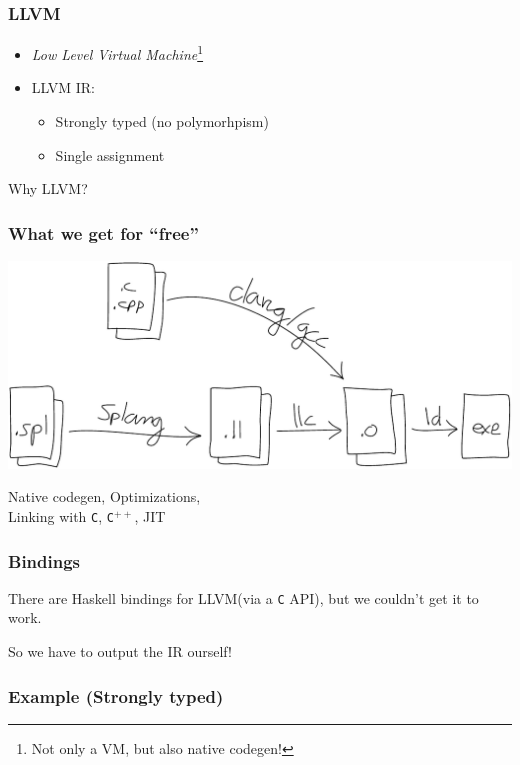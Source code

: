 \documentclass[14pt]{beamer}
\newcommand{\llvm}{\textsc{LLVM}\xspace}
\newcommand{\C}{\texttt{C}\xspace}
\newcommand{\Cpp}{\texttt{C}$^{++}$\xspace}
\begin{document}
\begin{frame}
	\frametitle{\llvm}

	\begin{itemize}
		\item \emph{Low Level Virtual Machine}\footnote{Not only a VM, but also native codegen!}
		\item \llvm IR:
		\begin{itemize}
			\item Strongly typed (no polymorhpism)
			\item Single assignment
		\end{itemize}
	\end{itemize}

	\bigskip
	\pause
	\begin{center}
		Why \llvm?
	\end{center}
\end{frame}

\begin{frame}
\begin{center}
	\frametitle{What we get for ``free''}
	\includegraphics[width=\textwidth]{linking}
	\bigskip

	Native codegen, \quad Optimizations,\\
	Linking with \C, \Cpp, \quad JIT
\end{center}
\end{frame}

\begin{frame}
	\frametitle{Bindings}
	There are Haskell bindings for \llvm (via a \C API), but we couldn't get it to work.

	\bigskip
	So we have to output the IR ourself!
\end{frame}

\begin{frame}
	\frametitle{Example (Strongly typed)}
	
\end{frame}
\end{document}
